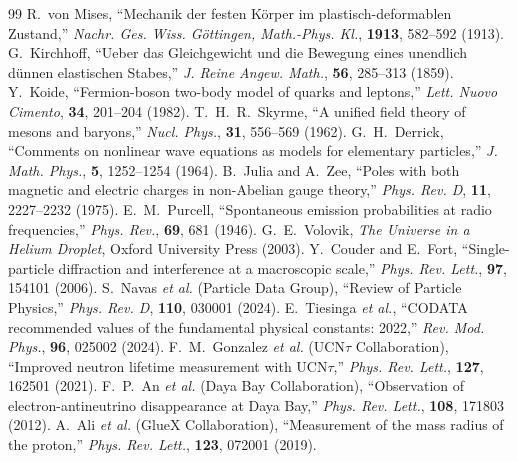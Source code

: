 \documentclass[12pt,a4paper]{article}
\begin{document}
																		\FloatBarrier 
\begin{thebibliography}{99}
 R.~von Mises, ``Mechanik der festen K{\"o}rper im plastisch-deformablen Zustand,'' \textit{Nachr. Ges. Wiss. G{\"o}ttingen, Math.-Phys. Kl.}, \textbf{1913}, 582--592 (1913).
 G.~Kirchhoff, ``Ueber das Gleichgewicht und die Bewegung eines unendlich d{\"u}nnen elastischen Stabes,'' \textit{J. Reine Angew. Math.}, \textbf{56}, 285--313 (1859).
 Y.~Koide, ``Fermion-boson two-body model of quarks and leptons,'' \textit{Lett. Nuovo Cimento}, \textbf{34}, 201--204 (1982).
 T.~H.~R.~Skyrme, ``A unified field theory of mesons and baryons,'' \textit{Nucl. Phys.}, \textbf{31}, 556--569 (1962).
 G.~H.~Derrick, ``Comments on nonlinear wave equations as models for elementary particles,'' \textit{J. Math. Phys.}, \textbf{5}, 1252--1254 (1964).
 B.~Julia and A.~Zee, ``Poles with both magnetic and electric charges in non-Abelian gauge theory,'' \textit{Phys. Rev. D}, \textbf{11}, 2227--2232 (1975).
 E.~M.~Purcell, ``Spontaneous emission probabilities at radio frequencies,'' \textit{Phys. Rev.}, \textbf{69}, 681 (1946).
 G.~E.~Volovik, \textit{The Universe in a Helium Droplet}, Oxford University Press (2003).
 Y.~Couder and E.~Fort, ``Single-particle diffraction and interference at a macroscopic scale,'' \textit{Phys. Rev. Lett.}, \textbf{97}, 154101 (2006).
 S.~Navas \textit{et al.} (Particle Data Group), ``Review of Particle Physics,'' \textit{Phys. Rev. D}, \textbf{110}, 030001 (2024).
 E.~Tiesinga \textit{et al.}, ``CODATA recommended values of the fundamental physical constants: 2022,'' \textit{Rev. Mod. Phys.}, \textbf{96}, 025002 (2024).
 F.~M.~Gonzalez \textit{et al.} (UCN$\tau$ Collaboration), ``Improved neutron lifetime measurement with UCN$\tau$,'' \textit{Phys. Rev. Lett.}, \textbf{127}, 162501 (2021).
 F.~P.~An \textit{et al.} (Daya Bay Collaboration), ``Observation of electron-antineutrino disappearance at Daya Bay,'' \textit{Phys. Rev. Lett.}, \textbf{108}, 171803 (2012).
 A.~Ali \textit{et al.} (GlueX Collaboration), ``Measurement of the mass radius of the proton,'' \textit{Phys. Rev. Lett.}, \textbf{123}, 072001 (2019).
\end{thebibliography}
																		
\end{document}
